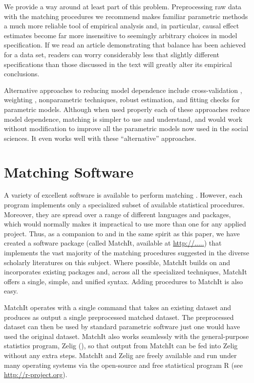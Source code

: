 \documentclass[11pt,titlepage]{article}
\begin{document}
We provide a way around at least part of this problem.  Preprocessing
raw data with the matching procedures we recommend makes familiar
parametric methods a much more reliable tool of empirical analysis
and, in particular, causal effect estimates become far more
insensitive to seemingly arbitrary choices in model specification.  If
we read an article demonstrating that balance has been achieved for a
data set, readers can worry considerably less that slightly different
specifications than those discussed in the text will greatly alter its
empirical conclusions.

Alternative approaches to reducing model dependence include
cross-validation \citep{BlaSmi04}, weighting \citep{RobRot03,
  HirImbRid03}, nonparametric techniques, robust estimation, and
fitting checks for parametric models.  Although when used properly
each of these approaches reduce model dependence, matching is simpler
to use and understand, and would work without modification to improve
all the parametric models now used in the social sciences.  It even
works well with these ``alternative'' approaches.

\appendix
\section{Matching Software}\label{s:matchit}

A variety of excellent software is available to perform matching
\citep{AbaDruLeb02, BecIch02, BerKos03, Hansen05, LeuSia04, Parsons00,
  Parsons01, Sekhon04}.  However, each program implements only a
specialized subset of available statistical procedures.  Moreover,
they are spread over a range of different languages and packages,
which would normally makes it impractical to use more than one for any
applied project.  Thus, as a companion to and in the same spirit as
this paper, we have created a software package (called MatchIt,
available at \url{http://.....})  that implements the vast majority of
the matching procedures suggested in the diverse scholarly literatures
on this subject.  Where possible, MatchIt builds on and incorporates
existing packages and, across all the specialized techniques, MatchIt
offers a single, simple, and unified syntax.  Adding procedures to
MatchIt is also easy.

MatchIt operates with a single command that takes an existing dataset
and produces as output a single preprocessed matched dataset.  The
preprocessed dataset can then be used by standard parametric software
just one would have used the original dataset.  MatchIt also works
seamlessly with the general-purpose statistics program, Zelig
(\citealt{ImaKinLau04}), so that output from MatchIt can be fed into
Zelig without any extra steps.  MatchIt and Zelig are freely available
and run under many operating systems via the open-source and free
statistical program R (see \url{http://r-project.org}).
\end{document}
